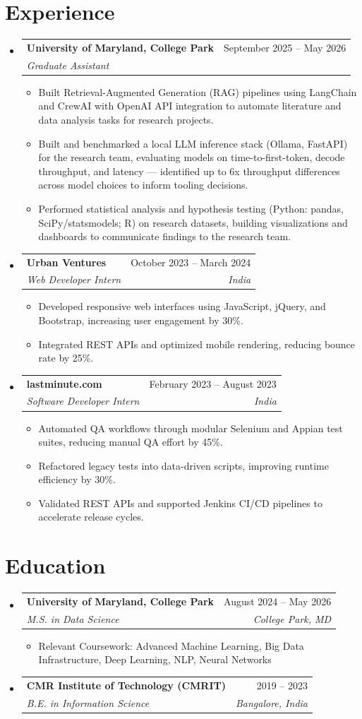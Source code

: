 \documentclass[letterpaper,10.5pt]{article}
\makeatletter
\newcommand{\resumeItem}[1]{
  \item\small{
    {#1 \vspace{-2pt}}
  }
}
\newcommand{\resumeSubheading}[4]{
  \vspace{-2pt}\item
    \begin{tabular*}{0.97\textwidth}[t]{l@{\extracolsep{\fill}}r}
      \textbf{#1} & #2 \\
      \textit{\small#3} & \textit{\small #4} \\
    \end{tabular*}\vspace{-7pt}
}
\newcommand{\resumeSubHeadingListStart}{\begin{itemize}[leftmargin=0.0in, label={}]}
\newcommand{\resumeSubHeadingListEnd}{\end{itemize}}
\newcommand{\resumeItemListStart}{\begin{itemize}[leftmargin=0.15in, label=\textbullet]}
\newcommand{\resumeItemListEnd}{\end{itemize}\vspace{-5pt}}
\makeatother
\begin{document}
\section{Experience}
  \resumeSubHeadingListStart

    \resumeSubheading
      {University of Maryland, College Park}{September 2025 -- May 2026}
      {Graduate Assistant}{}
      \resumeItemListStart
        \resumeItem{Built Retrieval-Augmented Generation (RAG) pipelines using LangChain and CrewAI with OpenAI API integration to automate literature and data analysis tasks for research projects.}
        \resumeItem{Built and benchmarked a local LLM inference stack (Ollama, FastAPI) for the research team, evaluating models on time-to-first-token, decode throughput, and latency --- identified up to 6x throughput differences across model choices to inform tooling decisions.}
        \resumeItem{Performed statistical analysis and hypothesis testing (Python: pandas, SciPy/statsmodels; R) on research datasets, building visualizations and dashboards to communicate findings to the research team.}
      \resumeItemListEnd

    \resumeSubheading
      {Urban Ventures}{October 2023 -- March 2024}
      {Web Developer Intern}{India}
      \resumeItemListStart
        \resumeItem{Developed responsive web interfaces using JavaScript, jQuery, and Bootstrap, increasing user engagement by 30\%.}
        \resumeItem{Integrated REST APIs and optimized mobile rendering, reducing bounce rate by 25\%.}
      \resumeItemListEnd

    \resumeSubheading
      {lastminute.com}{February 2023 -- August 2023}
      {Software Developer Intern}{India}
      \resumeItemListStart
        \resumeItem{Automated QA workflows through modular Selenium and Appian test suites, reducing manual QA effort by 45\%.}
        \resumeItem{Refactored legacy tests into data-driven scripts, improving runtime efficiency by 30\%.}
        \resumeItem{Validated REST APIs and supported Jenkins CI/CD pipelines to accelerate release cycles.}
      \resumeItemListEnd

  \resumeSubHeadingListEnd

\section{Education}
  \resumeSubHeadingListStart
    \resumeSubheading
      {University of Maryland, College Park}{August 2024 -- May 2026}
      {M.S. in Data Science}{College Park, MD}
      \resumeItemListStart
        \resumeItem{Relevant Coursework: Advanced Machine Learning, Big Data Infrastructure, Deep Learning, NLP, Neural Networks}
      \resumeItemListEnd
    \resumeSubheading
      {CMR Institute of Technology (CMRIT)}{2019 -- 2023}
      {B.E. in Information Science}{Bangalore, India}
  \resumeSubHeadingListEnd
\end{document}
